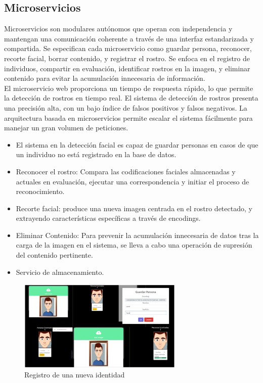 \documentclass[12pt]{article}
\begin{document}
\subsection{Microservicios}
Microservicios son modulares autónomos que operan con independencia y mantengan una comunicación coherente a través de una interfaz estandarizada y compartida. Se especifican cada microservicio como guardar persona, reconocer, recorte facial, borrar contenido, y registrar el rostro. Se enfoca en el registro de individuos, compartir en evaluación, identificar rostros en la imagen, y eliminar contenido para evitar la acumulación innecesaria de información.
\\El microservicio web proporciona un tiempo de respuesta rápido, lo que permite la detección de rostros en tiempo real.
El sistema de detección de rostros presenta una precisión alta, con un bajo índice de falsos positivos y falsos negativos.
La arquitectura basada en microservicios permite escalar el sistema fácilmente para manejar un gran volumen de peticiones.
\begin{itemize}
    \item El sistema en la detección facial es capaz de guardar personas en casos de que un individuo no está registrado en la base de datos.
    \item Reconocer el rostro: Compara las codificaciones faciales almacenadas y actuales en evaluación, ejecutar una correspondencia y initiar el proceso de reconocimiento.
    \item Recorte facial: produce una nueva imagen centrada en el rostro detectado, y extrayendo características específicas a través de encodings.
    \item Eliminar Contenido: Para prevenir la acumulación innecesaria de datos tras la carga de la imagen en el sistema, se lleva a cabo una operación de supresión del contenido pertinente.
    \item Servicio de almacenamiento.
\end{itemize}

\begin{figure}[ht]
  \centering
  \includegraphics[width=0.7\textwidth]{figura1.jpeg}
  \caption{Registro de una nueva identidad}
\end{figure}
\end{document}
